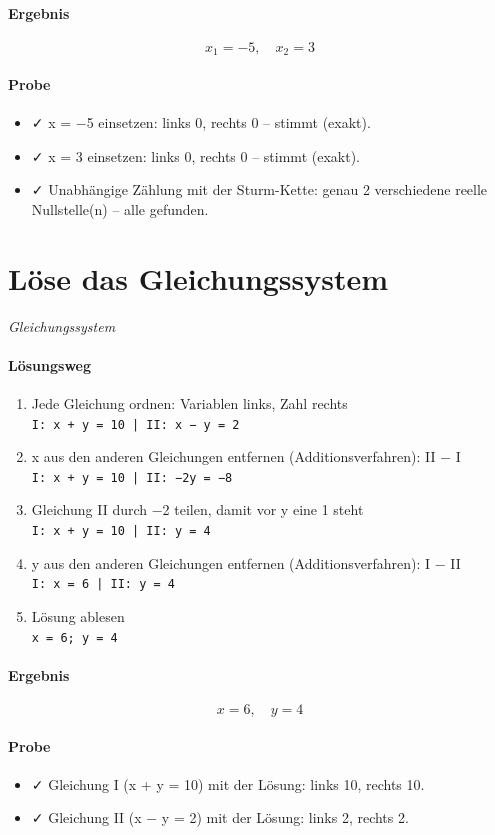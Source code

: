 \documentclass[11pt,a4paper]{article}
\begin{document}
\paragraph{Ergebnis}
\[ x_{1} = -5,\quad x_{2} = 3 \]
\paragraph{Probe}
\begin{itemize}
  \item ✓ x = −5 einsetzen: links 0, rechts 0 – stimmt (exakt).
  \item ✓ x = 3 einsetzen: links 0, rechts 0 – stimmt (exakt).
  \item ✓ Unabhängige Zählung mit der Sturm-Kette: genau 2 verschiedene reelle Nullstelle(n) – alle gefunden.
\end{itemize}
\section*{Löse das Gleichungssystem}
\textit{Gleichungssystem}

\paragraph{Lösungsweg}
\begin{enumerate}
  \item Jede Gleichung ordnen: Variablen links, Zahl rechts\\
  \texttt{I: x + y = 10 | II: x − y = 2}
  \item x aus den anderen Gleichungen entfernen (Additionsverfahren): II − I\\
  \texttt{I: x + y = 10 | II: −2y = −8}
  \item Gleichung II durch −2 teilen, damit vor y eine 1 steht\\
  \texttt{I: x + y = 10 | II: y = 4}
  \item y aus den anderen Gleichungen entfernen (Additionsverfahren): I − II\\
  \texttt{I: x = 6 | II: y = 4}
  \item Lösung ablesen\\
  \texttt{x = 6;  y = 4}
\end{enumerate}
\paragraph{Ergebnis}
\[ x = 6,\quad y = 4 \]
\paragraph{Probe}
\begin{itemize}
  \item ✓ Gleichung I (x + y = 10) mit der Lösung: links 10, rechts 10.
  \item ✓ Gleichung II (x − y = 2) mit der Lösung: links 2, rechts 2.
\end{itemize}
\end{document}
